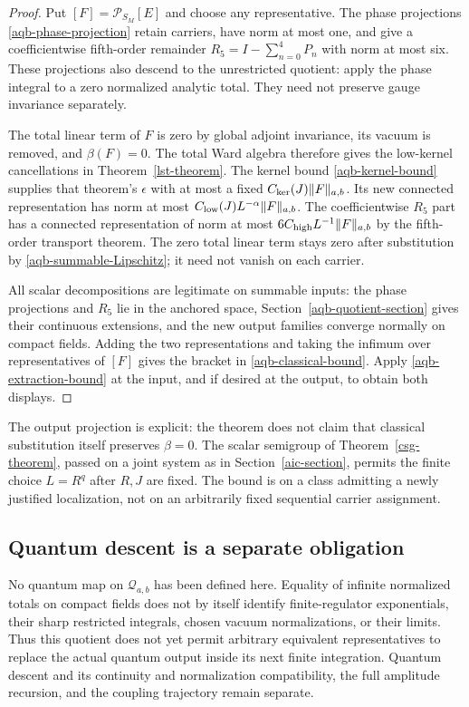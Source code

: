 \documentclass[11pt]{article}
\theoremstyle{remark}
\begin{document}
\begin{proof}
Put $[F]=\mathcal P_{S_M}[E]$ and choose any representative.
The phase projections \eqref{aqb-phase-projection} retain carriers,
have norm at most one, and give a coefficientwise fifth-order
remainder $R_5=I-\sum_{n=0}^4P_n$ with norm at most six.
These projections also descend to the unrestricted quotient:
apply the phase integral to a zero normalized analytic total.
They need not preserve gauge invariance separately.

The total linear term of $F$ is zero by global adjoint invariance,
its vacuum is removed, and $\beta(F)=0$. The total Ward algebra
therefore gives the low-kernel cancellations in
Theorem~\ref{lst-theorem}. The kernel bound
\eqref{aqb-kernel-bound} supplies that theorem's $\epsilon$ with
at most a fixed $C_{\rm ker}(J)\|F\|_{a,b}$. Its new connected
representation has norm at most
$C_{\rm low}(J)L^{-\alpha}\|F\|_{a,b}$.
The coefficientwise $R_5$ part has a connected representation
of norm at most $6C_{\rm high}L^{-1}\|F\|_{a,b}$ by the
fifth-order transport theorem. The zero total linear term stays
zero after substitution by \eqref{aqb-summable-Lipschitz}; it
need not vanish on each carrier.

All scalar decompositions are legitimate on summable inputs:
the phase projections and $R_5$ lie in the anchored space,
Section~\ref{aqb-quotient-section} gives their continuous
extensions, and the new output families converge normally on
compact fields. Adding the two representations and taking the
infimum over representatives of $[F]$ gives the bracket in
\eqref{aqb-classical-bound}. Apply
\eqref{aqb-extraction-bound} at the input, and if desired at
the output, to obtain both displays.
\end{proof}

The output projection is explicit: the theorem does not claim
that classical substitution itself preserves $\beta=0$.
The scalar semigroup of Theorem~\ref{csg-theorem}, passed on
a joint system as in Section~\ref{aic-section}, permits the
finite choice $L=R^q$ after $R,J$ are fixed. The bound is on a
class admitting a newly justified localization, not on an
arbitrarily fixed sequential carrier assignment.

\subsection{Quantum descent is a separate obligation}
\label{aqb-scope}

No quantum map on $\mathcal Q_{a,b}$ has been defined here.
Equality of infinite normalized totals on compact fields does
not by itself identify finite-regulator exponentials, their
sharp restricted integrals, chosen vacuum normalizations, or
their limits. Thus this quotient does not yet permit arbitrary
equivalent representatives to replace the actual quantum output
inside its next finite integration. Quantum descent and its
continuity and normalization compatibility, the full amplitude
recursion, and the coupling trajectory remain separate.
\end{document}
